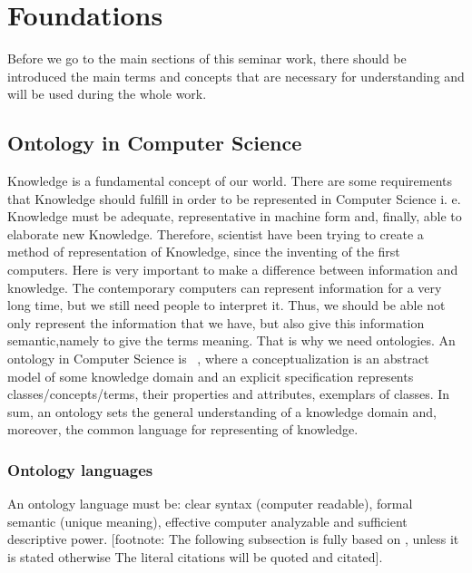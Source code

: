 \section{Foundations}
Before we go to the main sections of this seminar work, there should be introduced the main terms and concepts that are necessary for understanding and will be used during the whole work.

	\subsection{Ontology in Computer Science}
	Knowledge is a fundamental concept of our world. There are some requirements that Knowledge should fulfill in order to be represented in Computer Science i. e. Knowledge must be adequate, representative in machine form and, finally, able to elaborate new Knowledge. Therefore, scientist have been trying to create a method of representation of Knowledge, since the inventing of the first computers. Here is very important to make a difference between information and knowledge. The contemporary computers can represent information for a very long time, but we still need people to interpret it. Thus, we should be able not only represent the information that we have, but also give this information semantic,namely to give the terms meaning. That is why we need ontologies. An ontology in Computer Science is  \ , where a conceptualization is an abstract model of some knowledge domain and an explicit specification represents classes/concepts/terms, their properties and attributes, exemplars of classes. In sum, an ontology sets the general understanding of a knowledge domain and, moreover, the common language for representing of knowledge.     
		\subsubsection{Ontology languages}
		An ontology language must be: clear syntax (computer readable), formal semantic (unique meaning), effective computer analyzable and sufficient descriptive power. 
		[footnote: The following subsection is fully based on \cite{Kon10}, unless it is stated otherwise  The literal citations will be quoted and citated].
		

